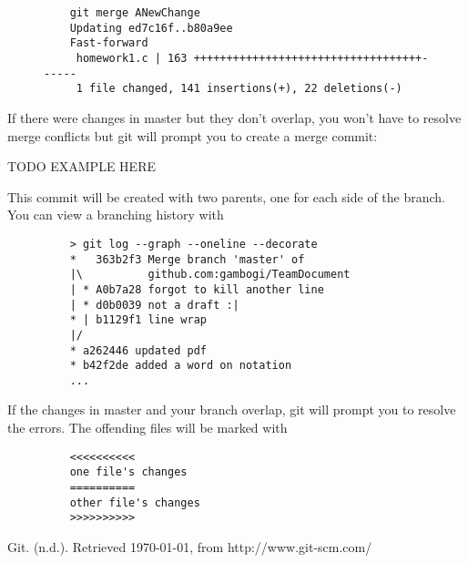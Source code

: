 \documentclass[11pt]{report}
\begin{document}
\begin{figure}[H]
  \begin{lstlisting}
    git merge ANewChange
    Updating ed7c16f..b80a9ee
    Fast-forward
     homework1.c | 163 +++++++++++++++++++++++++++++++++++------
     1 file changed, 141 insertions(+), 22 deletions(-)
  \end{lstlisting}
\end{figure}

If there were changes in master but they don't overlap, you won't have
to resolve merge conflicts but git will prompt you to create a merge
commit:

TODO EXAMPLE HERE

This commit will be created with two parents, one for each side of the
branch. You can view a branching history with

\begin{figure}[H]
  \begin{lstlisting}
    > git log --graph --oneline --decorate
    *   363b2f3 Merge branch 'master' of
    |\          github.com:gambogi/TeamDocument
    | * A0b7a28 forgot to kill another line
    | * d0b0039 not a draft :|
    * | b1129f1 line wrap
    |/  
    * a262446 updated pdf
    * b42f2de added a word on notation
    ...
  \end{lstlisting}
\end{figure}

If the changes in master and your branch overlap, git will prompt you
to resolve the errors. The offending files will be marked with

\begin{figure}[H]
  \begin{lstlisting}
    <<<<<<<<<<
    one file's changes
    ==========
    other file's changes
    >>>>>>>>>>
  \end{lstlisting}
\end{figure}

\begin{thebibliography}{9}

    Git. (n.d.). Retrieved \today, from http://www.git-scm.com/

\end{thebibliography}
\end{document}
